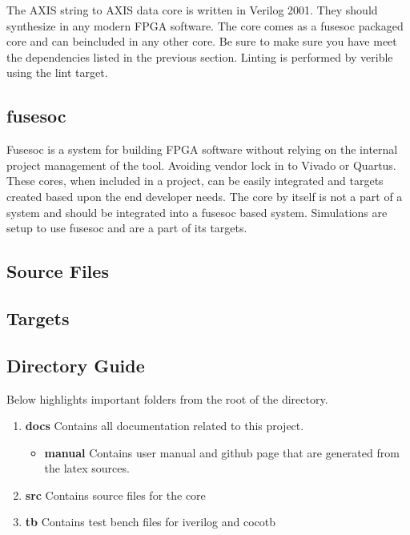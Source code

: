 \par
The AXIS string to AXIS data core is written in Verilog 2001. They should synthesize in any modern FPGA software. The core comes as a fusesoc packaged core and can beincluded in any other core. Be sure to make sure you have meet the dependencies listed in the previous section. Linting is performed by verible using the lint target.

\subsection{fusesoc}
\par
Fusesoc is a system for building FPGA software without relying on the internal project management of the tool. Avoiding vendor lock in to Vivado or Quartus.
These cores, when included in a project, can be easily integrated and targets created based upon the end developer needs. The core by itself is not a part of
a system and should be integrated into a fusesoc based system. Simulations are setup to use fusesoc and are a part of its targets.

\subsection{Source Files}



\subsection{Targets}



\subsection{Directory Guide}

\par
Below highlights important folders from the root of the directory.

\begin{enumerate}
  \item \textbf{docs} Contains all documentation related to this project.
    \begin{itemize}
      \item \textbf{manual} Contains user manual and github page that are generated from the latex sources.
    \end{itemize}
  \item \textbf{src} Contains source files for the core
  \item \textbf{tb} Contains test bench files for iverilog and cocotb
\end{enumerate}

